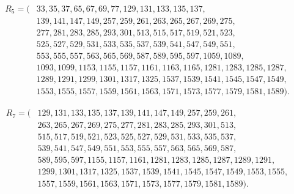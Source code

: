 \[
\begin{split}
R_{5}=\bigl( &33,35,37,65,67,69,77,129,131,133,135,137,\\
 &139,141,147,149,257,259,261,263,265,267,269,275,\\
 &277,281,283,285,293,301,513,515,517,519,521,523,\\
 &525,527,529,531,533,535,537,539,541,547,549,551,\\
 &553,555,557,563,565,569,587,589,595,597,1059,1089,\\
 &1093,1099,1153,1155,1157,1161,1163,1165,1281,1283,1285,1287,\\
 &1289,1291,1299,1301,1317,1325,1537,1539,1541,1545,1547,1549,\\
 &1553,1555,1557,1559,1561,1563,1571,1573,1577,1579,1581,1589\bigr).
\end{split}
\]

\[
\begin{split}
R_{7}=\bigl( &129,131,133,135,137,139,141,147,149,257,259,261,\\
 &263,265,267,269,275,277,281,283,285,293,301,513,\\
 &515,517,519,521,523,525,527,529,531,533,535,537,\\
 &539,541,547,549,551,553,555,557,563,565,569,587,\\
 &589,595,597,1155,1157,1161,1281,1283,1285,1287,1289,1291,\\
 &1299,1301,1317,1325,1537,1539,1541,1545,1547,1549,1553,1555,\\
 &1557,1559,1561,1563,1571,1573,1577,1579,1581,1589\bigr).
\end{split}
\]
